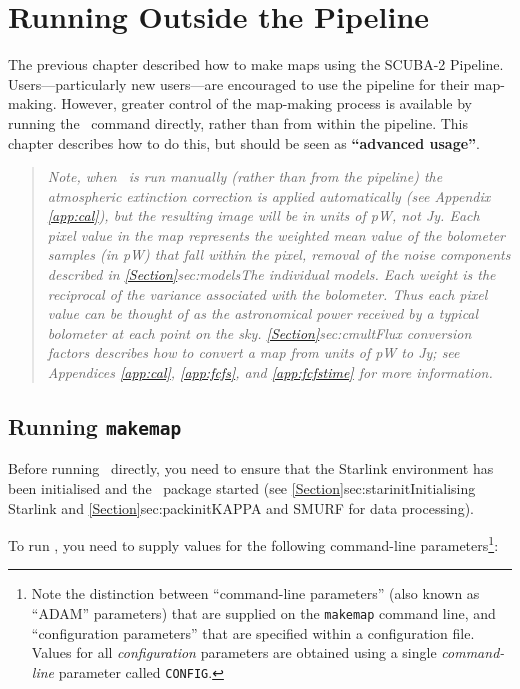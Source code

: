 \chapter{Running  Outside the Pipeline}
\label{sec:manual}

The previous chapter described how to make maps using the SCUBA-2 Pipeline.
Users---particularly new users---are encouraged to use the pipeline for
their map-making. However, greater control of the map-making
process is available by running the \makemap\ command directly, rather
than from within the pipeline. This chapter describes how to do this, but
should be seen as \textbf{``advanced usage''}.

\begin{quote}
\emph{
Note, when \makemap\ is run manually (rather than from the pipeline) the
atmospheric extinction correction is applied automatically (see Appendix \ref{app:cal}),
but the resulting image will be in units of pW, not Jy. Each pixel value
in the map represents the weighted mean value of the bolometer samples
(in pW) that fall within the pixel, removal of the noise components
described in \cref{Section}{sec:models}{The individual models}.  Each
weight is the reciprocal of the variance associated with the bolometer.
Thus each pixel value can be thought of as the astronomical power
received by a typical bolometer at each point on the sky.
\cref{Section}{sec:cmult}{Flux conversion factors} describes how to
convert a map from units of pW to Jy; see Appendices \ref{app:cal},
\ref{app:fcfs}, and \ref{app:fcfstime} for more information.
}
\end{quote}

\section{Running \texttt{makemap}}

Before running \makemap\ directly, you need to ensure that the Starlink
environment has been initialised and the \smurf\ package started (see
\cref{Section}{sec:starinit}{Initialising Starlink} and
\cref{Section}{sec:packinit}{KAPPA and SMURF for data processing}).

To run \makemap, you  need to supply values for the following
command-line parameters\footnote{Note the distinction between
``command-line parameters'' (also known as ``ADAM'' parameters) that are
supplied on the \texttt{makemap} command line, and ``configuration parameters''
that are specified within a configuration file. Values for all
\emph{configuration} parameters are obtained using a single \emph{command-line}
parameter called \texttt{CONFIG}.}:

